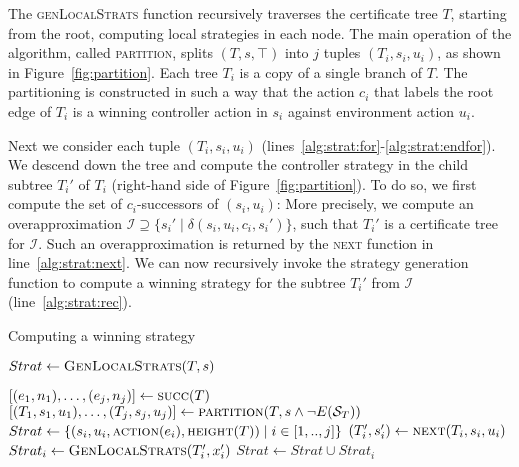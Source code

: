The \textsc{genLocalStrats} function recursively traverses the certificate tree $T$, starting from the root, computing local strategies in each node.  The main operation of the algorithm, called \textsc{partition}, splits $(T, s, \top)$ into $j$ tuples $(T_i, s_i, u_i)$, as shown in Figure~\ref{fig:partition}.  Each tree $T_i$ is a copy of a single branch of $T$.  The partitioning is constructed in such a way that the action $c_i$ that labels the root edge of $T_i$ is a winning controller action in $s_i$ against environment action $u_i$.

Next we consider each tuple $(T_i, s_i, u_i)$ (lines~\ref{alg:strat:for}-\ref{alg:strat:endfor}). We descend down the tree and compute the controller strategy in the child subtree $T_i'$ of $T_i$ (right-hand side of Figure~\ref{fig:partition}).  To do so, we first compute the set of $c_i$-successors of $(s_i, u_i)$: More precisely, we compute an overapproximation $\mathcal{I} \supseteq \{ s_i' \mid \delta(s_i, u_i, c_i, s_i') \}$, such that $T_i'$ is a certificate tree for $\mathcal{I}$.  Such an overapproximation is returned by the \textsc{next} function in line~\ref{alg:strat:next}.  We can now recursively invoke the strategy generation function to compute a winning strategy for the subtree $T_i'$ from $\mathcal{I}$ (line~\ref{alg:strat:rec}).

\begin{algorithm}
   \caption{Computing a winning strategy}\label{alg:strat}
   \begin{algorithmic}[1]
            \State $Strat \gets \Call{GenLocalStrats}{T,s}$
            \State {}
        \EndFunction
        \Statex

            \State $[(e_1, n_1),\ldots,(e_j, n_j)] \gets \Call{succ}{T}$
            \State $[(T_1,s_1,u_1),\ldots,(T_j, s_j, u_j)] \gets \textsc{partition}(T, s \land \neg E(\mathcal{S}_T))$
            \State $Strat \gets \{(s_i, u_i, \Call{action}{e_i}, \Call{height}{T}) \mid i \in[1,..,j]\}$\label{alg:strat:strati}
            \label{alg:strat:for}
                \State $(T_i', s_i') \gets \textsc{next}(T_i, s_i, u_i)$\label{alg:strat:next}
                \State $Strat_i \gets \Call{GenLocalStrats}{T_i', x_i'}$\label{alg:strat:rec}
                \State $Strat \gets Strat \cup Strat_i$
            \EndFor\label{alg:strat:endfor}
            \State {} \label{alg:strat:return}
        \EndFunction
    \end{algorithmic}
\end{algorithm}

